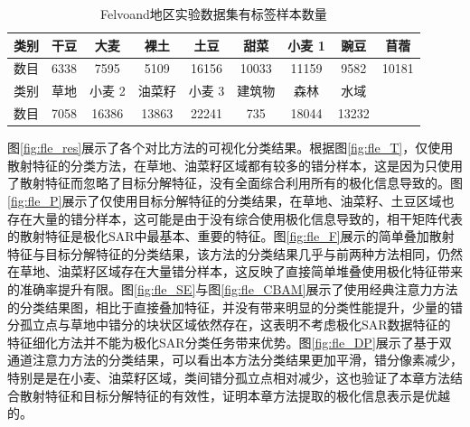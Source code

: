 \begin{table}[h]
    \caption{Felvoand地区实验数据集有标签样本数量}
    \begin{tabular}{|c|c|c|c|c|c|c|c|c|}
        \hline 类别 & 干豆   & 大麦    & 裸土    & 土豆    & 甜菜    & 小麦 1  & 豌豆    & 苜蓿
        \\
        \hline 数目 & 6338 & 7595  & 5109  & 16156 & 10033 & 11159 & 9582  & 10181 \\
        \hline 类别 & 草地   & 小麦 2  & 油菜籽   & 小麦 3  & 建筑物   & 森林    & 水域    &       \\
        \hline 数目 & 7058 & 16386 & 13863 & 22241 & 735   & 18044 & 13232 &       \\
        \hline
    \end{tabular}
    \label{flevoland_smaple}
\end{table}

图\ref{fig:fle_res}展示了各个对比方法的可视化分类结果。根据图\ref{fig:fle_T}，仅使用散射特征的分类方法，在草地、油菜籽区域都有较多的错分样本，这是因为只使用了散射特征而忽略了目标分解特征，没有全面综合利用所有的极化信息导致的。图\ref{fig:fle_P}展示了仅使用目标分解特征的分类结果，在草地、油菜籽、土豆区域也存在大量的错分样本，这可能是由于没有综合使用极化信息导致的，相干矩阵代表的散射特征是极化SAR中最基本、重要的特征。图\ref{fig:fle_F}展示的简单叠加散射特征与目标分解特征的分类结果，该方法的分类结果几乎与前两种方法相同，仍然在草地、油菜籽区域存在大量错分样本，这反映了直接简单堆叠使用极化特征带来的准确率提升有限。图\ref{fig:fle_SE}与图\ref{fig:fle_CBAM}展示了使用经典注意力方法的分类结果图，相比于直接叠加特征，并没有带来明显的分类性能提升，少量的错分孤立点与草地中错分的块状区域依然存在，这表明不考虑极化SAR数据特征的特征细化方法并不能为极化SAR分类任务带来优势。图\ref{fig:fle_DP}展示了基于双通道注意力方法的分类结果，可以看出本方法分类结果更加平滑，错分像素减少，特别是是在小麦、油菜籽区域，类间错分孤立点相对减少，这也验证了本章方法结合散射特征和目标分解特征的有效性，证明本章方法提取的极化信息表示是优越的。


